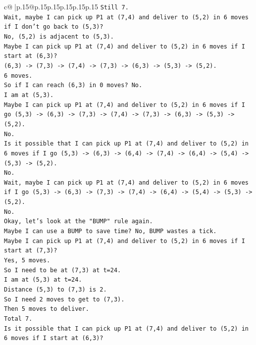 \documentclass{article}
\begin{document}
{\begin{supertabular}{c@{$\;$}|p{.15\linewidth}@{}p{.15\linewidth}p{.15\linewidth}p{.15\linewidth}p{.15\linewidth}p{.15\linewidth}}
{{{\texttt{Still 7.} \\
\texttt{Wait, maybe I can pick up P1 at (7,4) and deliver to (5,2) in 6 moves if I don't go back to (5,3)?} \\
\texttt{No, (5,2) is adjacent to (5,3).} \\
\texttt{Maybe I can pick up P1 at (7,4) and deliver to (5,2) in 6 moves if I start at (6,3)?} \\
\texttt{(6,3) {-}> (7,3) {-}> (7,4) {-}> (7,3) {-}> (6,3) {-}> (5,3) {-}> (5,2).} \\
\texttt{6 moves.} \\
\texttt{So if I can reach (6,3) in 0 moves? No.} \\
\texttt{I am at (5,3).} \\
\texttt{Maybe I can pick up P1 at (7,4) and deliver to (5,2) in 6 moves if I go (5,3) {-}> (6,3) {-}> (7,3) {-}> (7,4) {-}> (7,3) {-}> (6,3) {-}> (5,3) {-}> (5,2).} \\
\texttt{No.} \\
\texttt{Is it possible that I can pick up P1 at (7,4) and deliver to (5,2) in 6 moves if I go (5,3) {-}> (6,3) {-}> (6,4) {-}> (7,4) {-}> (6,4) {-}> (5,4) {-}> (5,3) {-}> (5,2).} \\
\texttt{No.} \\
\texttt{Wait, maybe I can pick up P1 at (7,4) and deliver to (5,2) in 6 moves if I go (5,3) {-}> (6,3) {-}> (7,3) {-}> (7,4) {-}> (6,4) {-}> (5,4) {-}> (5,3) {-}> (5,2).} \\
\texttt{No.} \\
\texttt{Okay, let's look at the "BUMP" rule again.} \\
\texttt{Maybe I can use a BUMP to save time? No, BUMP wastes a tick.} \\
\texttt{Maybe I can pick up P1 at (7,4) and deliver to (5,2) in 6 moves if I start at (7,3)?} \\
\texttt{Yes, 5 moves.} \\
\texttt{So I need to be at (7,3) at t=24.} \\
\texttt{I am at (5,3) at t=24.} \\
\texttt{Distance (5,3) to (7,3) is 2.} \\
\texttt{So I need 2 moves to get to (7,3).} \\
\texttt{Then 5 moves to deliver.} \\
\texttt{Total 7.} \\
\texttt{Is it possible that I can pick up P1 at (7,4) and deliver to (5,2) in 6 moves if I start at (6,3)?} \\
}}}
\end{supertabular}}
\end{document}
